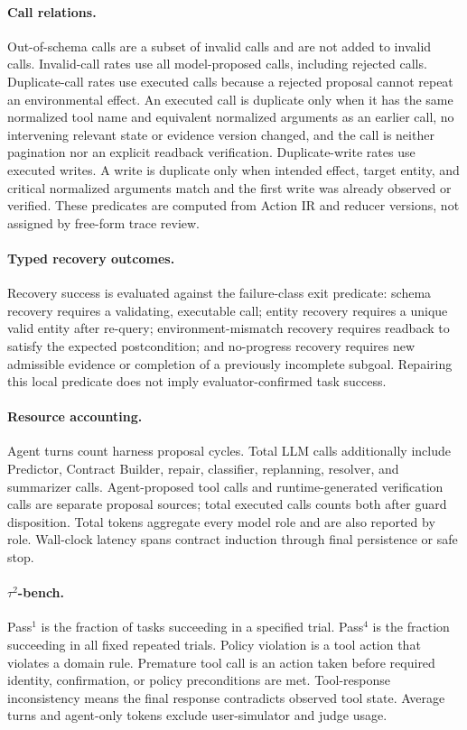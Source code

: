 \paragraph{Call relations.}
Out-of-schema calls are a subset of invalid calls and are not added to invalid
calls. Invalid-call rates use all model-proposed calls, including rejected calls.
Duplicate-call rates use executed calls because a rejected proposal cannot repeat
an environmental effect. An executed call is duplicate only when it has the same
normalized tool name and equivalent normalized arguments as an earlier call, no
intervening relevant state or evidence version changed, and the call is neither
pagination nor an explicit readback verification. Duplicate-write rates use
executed writes. A write is duplicate only when intended effect, target entity,
and critical normalized arguments match and the first write was already observed
or verified. These predicates are computed from Action IR and reducer versions,
not assigned by free-form trace review.

\paragraph{Typed recovery outcomes.}
Recovery success is evaluated against the failure-class exit predicate: schema
recovery requires a validating, executable call; entity recovery requires a unique
valid entity after re-query; environment-mismatch recovery requires readback to
satisfy the expected postcondition; and no-progress recovery requires new
admissible evidence or completion of a previously incomplete subgoal. Repairing
this local predicate does not imply evaluator-confirmed task success.

\paragraph{Resource accounting.}
Agent turns count harness proposal cycles. Total LLM calls additionally include
Predictor, Contract Builder, repair, classifier, replanning, resolver, and
summarizer calls. Agent-proposed tool calls and runtime-generated verification
calls are separate proposal sources; total executed calls counts both after guard
disposition. Total tokens aggregate every model role and are also reported by
role. Wall-clock latency spans contract induction through final persistence or
safe stop.

\paragraph{$\tau^2$-bench.}
Pass$^1$ is the fraction of tasks succeeding in a specified trial. Pass$^4$ is
the fraction succeeding in all \TauTrialsPerTask{} fixed repeated trials. Policy
violation is a tool action that violates a domain rule. Premature tool call is an
action taken before required identity, confirmation, or policy preconditions are
met. Tool-response inconsistency means the final response contradicts observed
tool state. Average turns and agent-only tokens exclude user-simulator and judge
usage.

